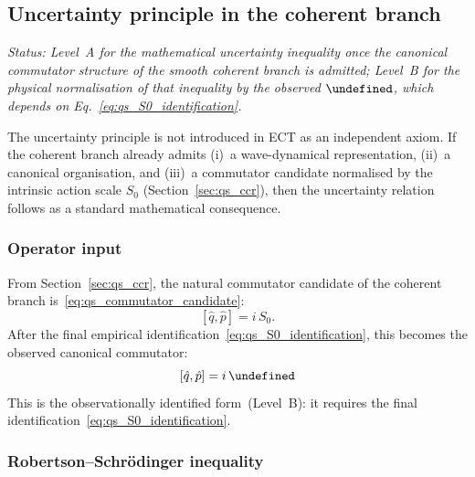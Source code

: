 \documentclass[11pt,a4paper]{article}
\let\hbar\undefined
\numberwithin{equation}{section}
\begin{document}
\subsection{Uncertainty principle in the coherent branch}
\label{sec:qs_uncertainty}
\label{sec:uncertainty}

\textit{Status: Level~A for the mathematical uncertainty inequality
once the canonical commutator structure of the smooth coherent branch
is admitted; Level~B for the physical normalisation of that inequality
by the observed $\hbar$, which depends on
Eq.~\eqref{eq:qs_S0_identification}.}

\medskip
The uncertainty principle is not introduced in ECT as an independent
axiom.
If the coherent branch already admits (i)~a wave-dynamical
representation, (ii)~a canonical organisation, and (iii)~a commutator
candidate normalised by the intrinsic action scale $S_0$
(Section~\ref{sec:qs_ccr}), then the uncertainty relation follows as
a standard mathematical consequence.

\subsubsection*{Operator input}

From Section~\ref{sec:qs_ccr}, the natural commutator candidate of the
coherent branch is~\eqref{eq:qs_commutator_candidate}:
\begin{equation}
  \label{eq:qs_unc_comm}
  [\hat q,\hat p]
  = i\,S_0.
\end{equation}
After the final empirical identification~\eqref{eq:qs_S0_identification},
this becomes the observed canonical commutator:
\begin{equation}
  \label{eq:qs_unc_comm_hbar}
  [\hat q,\hat p]
  = i\,\hbar
\end{equation}
This is the observationally identified form~(Level~B):
it requires the final identification~\eqref{eq:qs_S0_identification}.

\subsubsection*{Robertson--Schr\"odinger inequality}
\end{document}
